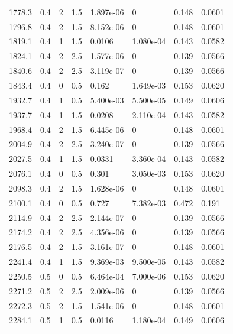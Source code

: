 \documentclass[preview]{standalone}
\begin{document}
{{{\begin{tabular}{L{1.2cm}C{1.2cm} C{0.3cm}C{0.5cm} C{1.4cm}C{1.4cm} C{1.4cm}C{1.4cm}}
  1778.3  &   0.4  & 2     & 1.5 &  1.897e-06  & 0  & 0.148 &  0.0601   \\ 
  1796.8  &   0.4  & 2     & 1.5 &  8.152e-06  & 0  & 0.148 &  0.0601   \\ 
  1819.1  &   0.4  & 1     & 1.5 &  0.0106  & 1.080e-04  & 0.143 &  0.0582   \\ 
  1824.1  &   0.4  & 2     & 2.5 &  1.577e-06  & 0  & 0.139 &  0.0566   \\ 
  1840.6  &   0.4  & 2     & 2.5 &  3.119e-07  & 0  & 0.139 &  0.0566   \\ 
  1843.4  &   0.4  & 0     & 0.5 &  0.162  & 1.649e-03  & 0.153 &  0.0620   \\ 
  1932.7  &   0.4  & 1     & 0.5 &  5.400e-03  & 5.500e-05  & 0.149 &  0.0606   \\ 
  1937.7  &   0.4  & 1     & 1.5 &  0.0208  & 2.110e-04  & 0.143 &  0.0582   \\ 
  1968.4  &   0.4  & 2     & 1.5 &  6.445e-06  & 0  & 0.148 &  0.0601   \\ 
  2004.9  &   0.4  & 2     & 2.5 &  3.240e-07  & 0  & 0.139 &  0.0566   \\ 
  2027.5  &   0.4  & 1     & 1.5 &  0.0331  & 3.360e-04  & 0.143 &  0.0582   \\ 
  2076.1  &   0.4  & 0     & 0.5 &  0.301  & 3.050e-03  & 0.153 &  0.0620   \\ 
  2098.3  &   0.4  & 2     & 1.5 &  1.628e-06  & 0  & 0.148 &  0.0601   \\ 
  2100.1  &   0.4  & 0     & 0.5 &  0.727  & 7.382e-03  & 0.472 &  0.191   \\ 
  2114.9  &   0.4  & 2     & 2.5 &  2.144e-07  & 0  & 0.139 &  0.0566   \\ 
  2174.2  &   0.4  & 2     & 2.5 &  4.356e-06  & 0  & 0.139 &  0.0566   \\ 
  2176.5  &   0.4  & 2     & 1.5 &  3.161e-07  & 0  & 0.148 &  0.0601   \\ 
  2241.4  &   0.4  & 1     & 1.5 &  9.369e-03  & 9.500e-05  & 0.143 &  0.0582   \\ 
  2250.5  &   0.5  & 0     & 0.5 &  6.464e-04  & 7.000e-06  & 0.153 &  0.0620   \\ 
  2271.2  &   0.5  & 2     & 2.5 &  2.009e-06  & 0  & 0.139 &  0.0566   \\ 
  2272.3  &   0.5  & 2     & 1.5 &  1.541e-06  & 0  & 0.148 &  0.0601   \\ 
  2284.1  &   0.5  & 1     & 0.5 &  0.0116  & 1.180e-04  & 0.149 &  0.0606   \\ 

\end{tabular}}}}
\end{document}
